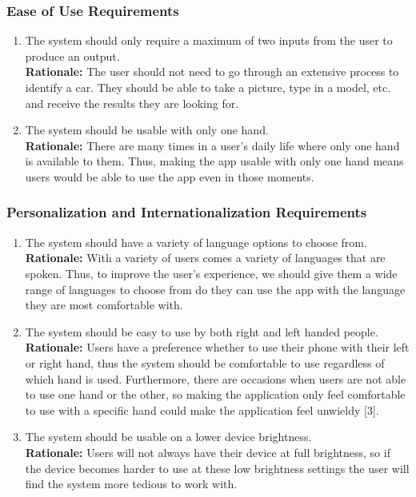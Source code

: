 \documentclass[]{article}
\begin{document}
\subsubsection{Ease of Use Requirements}
\label{ssub:ease_of_use_requirements}
\begin{enumerate}[label={UH-EOU\arabic*.}]
	\item The system should only require a maximum of two inputs from the user to produce an output.\\
	\textbf{Rationale:} The user should not need to go through an extensive process to identify a car. They should be able to take a picture, type in a model, etc. and receive the results they are looking for.
	\item The system should be usable with only one hand.\\
	\textbf{Rationale:} There are many times in a user's daily life where only one hand is available to them. Thus, making the app usable with only one hand means users would be able to use the app even in those moments.
\end{enumerate}

\subsubsection{Personalization and Internationalization Requirements}
\label{ssub:personalization_and_internationalization_requirements}
\begin{enumerate}[label={UH-PI\arabic*.}]
	\item The system should have a variety of language options to choose from.\\
	\textbf{Rationale:} With a variety of users comes a variety of languages that are spoken. Thus, to improve the user's experience, we should give them a wide range of languages to choose from do they can use the app with the language they are most comfortable with.
	\item The system should be easy to use by both right and left handed people.\\
	\textbf{Rationale:} Users have a preference whether to use their phone with their left or right hand, thus the system should be comfortable to use regardless of which hand is used. Furthermore, there are occasions when users are not able to use one hand or the other, so making the application only feel comfortable to use with a specific hand could make the application feel unwieldy [3].
	\item The system should be usable on a lower device brightness.\\
	\textbf{Rationale:} Users will not always have their device at full brightness, so if the device becomes harder to use at these low brightness settings the user will find the system more tedious to work with.
\end{enumerate}
\end{document}
